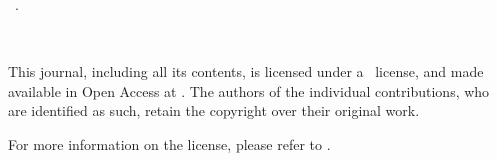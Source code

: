 \null\vfill\small
\noindent\thejournal \ \thevolume. \thejournalsubtitle \\ \par
\noindent\doclicenseIcon \ \theyear \\ \par 
\noindent This journal, including all its contents, is licensed under a \doclicenseLongNameRef \ license, and made available in Open Access at \href{\thewebsite}{\thewebsite}. The authors of the individual contributions, who are identified as such, retain the copyright over their original work.  \\ \par
\noindent For more information on the \doclicenseNameRef license, please refer to \doclicenseURL.   
\newpage